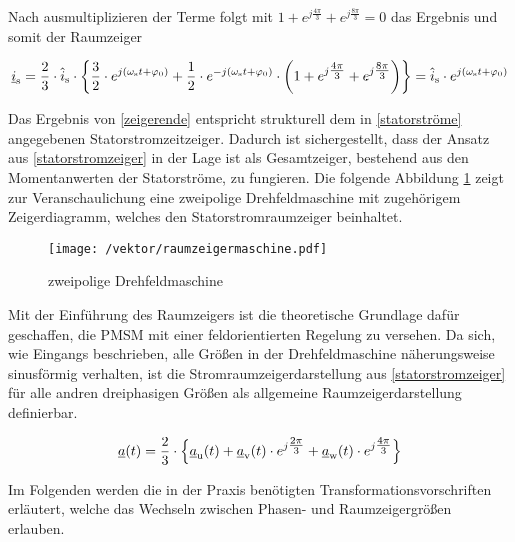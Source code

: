 Nach ausmultiplizieren der Terme folgt mit $1+e^{j\tfrac{4\pi}{3}}+e^{j\tfrac{8\pi}{3}}=0$ das Ergebnis und somit der Raumzeiger

\begin{align}
\begin{split}
	\underline{i}_{\mathrm{s}} = \frac{2}{3} \cdot \hat{i}_{\mathrm{s}}\cdot\biggl\{ \frac{3}{2} \cdot  e^{j(\omega_{\mathrm{s}}t+\varphi_{\mathrm{0}})} + \frac{1}{2} \cdot e^{-j(\omega_{\mathrm{s}}t+\varphi_{\mathrm{0}})} \cdot \bigg( 1+e^{j\tfrac{4\pi}{3}}+e^{j\tfrac{8\pi}{3}} \bigg)  \biggr\} = \hat{i}_{\mathrm{s}} \cdot e^{j(\omega_{\mathrm{s}}t+\varphi_{\mathrm{0}})}
	\label{zeigerende}
\end{split}
\end{align}

\newpage

Das Ergebnis von \ref{zeigerende} entspricht strukturell dem in \ref{statorströme} angegebenen Statorstromzeitzeiger. 
Dadurch ist sichergestellt, dass der Ansatz aus \ref{statorstromzeiger} in der Lage ist als Gesamtzeiger, bestehend aus den Momentanwerten der Statorströme, zu fungieren. 
Die folgende Abbildung \ref{fig:raumzeigermaschine} zeigt zur Veranschaulichung eine zweipolige Drehfeldmaschine mit zugehörigem Zeigerdiagramm, welches den Statorstromraumzeiger beinhaltet. 

\begin{figure}[h]
	\centering
	\texttt{[image: /vektor/raumzeigermaschine.pdf]}
	\label{fig:raumzeigermaschine}
	\caption{zweipolige Drehfeldmaschine}
\end{figure}


Mit der Einführung des Raumzeigers ist die theoretische Grundlage dafür geschaffen, die PMSM mit einer feldorientierten Regelung zu versehen. 
Da sich, wie Eingangs beschrieben, alle Größen in der Drehfeldmaschine näherungsweise sinusförmig verhalten, ist die Stromraumzeigerdarstellung aus \ref{statorstromzeiger} für alle andren dreiphasigen Größen als allgemeine Raumzeigerdarstellung definierbar.

\begin{align}
	\underline{a}(t) = \frac{2}{3} \cdot \Bigl\{\underline{a}_{\mathrm{u}}(t) + \underline{a}_{\mathrm{v}}(t)\cdot e^{j\tfrac{2\pi}{3}} + \underline{a}_{\mathrm{w}}(t)\cdot e^{j\tfrac{4\pi}{3}} \Bigr\} \label{raumzeigerdefinition}
\end{align}

Im Folgenden werden die in der Praxis benötigten Transformationsvorschriften erläutert, welche das Wechseln zwischen Phasen- und Raumzeigergrößen erlauben.


